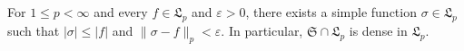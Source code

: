For $1 \leq p < \infty$ and every $f \in \mathfrak{L}_p$ and $\varepsilon > 0$, there exists a simple function $\sigma \in \mathfrak{L}_p$ such that $|\sigma| \leq |f|$ and $\|\sigma - f\|_p < \varepsilon$. In particular, $\mathfrak{S} \cap \mathfrak{L}_p$ is dense in $\mathfrak{L}_p$.
